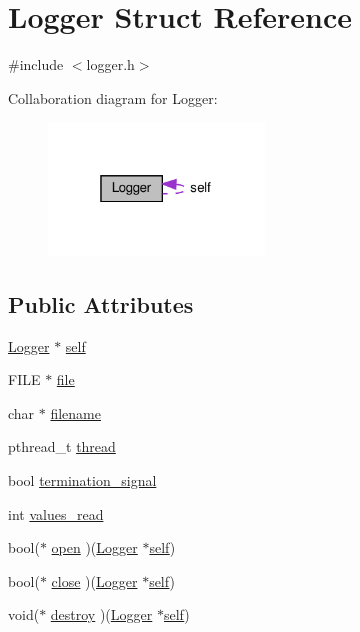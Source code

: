 \hypertarget{structLogger}{}\section{Logger Struct Reference}
\label{structLogger}


{\ttfamily \#include $<$logger.\+h$>$}



Collaboration diagram for Logger\+:\nopagebreak
\begin{figure}[H]
\begin{center}
\leavevmode
\includegraphics[width=163pt]{structLogger__coll__graph}
\end{center}
\end{figure}
\subsection*{Public Attributes}
\begin{DoxyCompactItemize}
\item 
\hyperlink{structLogger}{Logger} $\ast$ \hyperlink{structLogger_a220cd94b89be365dba07df9cbdf2d15f}{self}
\item 
F\+I\+LE $\ast$ \hyperlink{structLogger_ad00c914c1f38de6d069cb788b9074d8f}{file}
\item 
char $\ast$ \hyperlink{structLogger_a4a7913dbecc583e935e8c18ec62716ab}{filename}
\item 
pthread\+\_\+t \hyperlink{structLogger_a69e132f8b832286f2bfd777d0a6bc266}{thread}
\item 
bool \hyperlink{structLogger_af3c673bf2d3f729549722c0beab4f34c}{termination\+\_\+signal}
\item 
int \hyperlink{structLogger_aa5a4930df402c7b25487a1315b9a94f4}{values\+\_\+read}
\item 
bool($\ast$ \hyperlink{structLogger_a8b371035a67cc1da7cd1c0d0ae5dd69d}{open} )(\hyperlink{structLogger}{Logger} $\ast$\hyperlink{structLogger_a220cd94b89be365dba07df9cbdf2d15f}{self})
\item 
bool($\ast$ \hyperlink{structLogger_a13192d1a123f8373bc8f9d680c8a8528}{close} )(\hyperlink{structLogger}{Logger} $\ast$\hyperlink{structLogger_a220cd94b89be365dba07df9cbdf2d15f}{self})
\item 
void($\ast$ \hyperlink{structLogger_ab665b6bcc0afa850994e8ad4cc4e6c4f}{destroy} )(\hyperlink{structLogger}{Logger} $\ast$\hyperlink{structLogger_a220cd94b89be365dba07df9cbdf2d15f}{self})
\end{DoxyCompactItemize}


